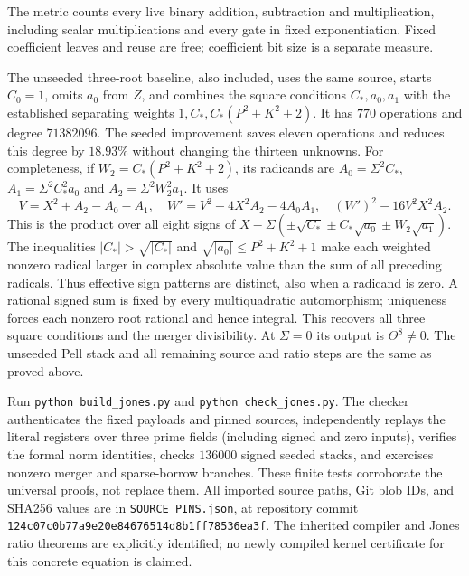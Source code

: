 The metric counts every live binary addition, subtraction and multiplication,
including scalar multiplications and every gate in fixed exponentiation.
Fixed coefficient leaves and reuse are free; coefficient bit size is a
separate measure.

The unseeded three-root baseline, also included, uses the same source,
starts $C_0=1$, omits $a_0$ from $Z$, and combines the square conditions
$C_*,a_0,a_1$ with the established separating weights
$1,C_*,C_*(P^2+K^2+2)$. It has $770$ operations and degree $71382096$.
The seeded improvement saves eleven operations and reduces this degree by
$18.93\%$ without changing the thirteen unknowns.
For completeness, if $W_2=C_*(P^2+K^2+2)$, its radicands are
$A_0=\Sigma^2C_*$, $A_1=\Sigma^2C_*^2a_0$ and
$A_2=\Sigma^2W_2^2a_1$. It uses
\[
 V=X^2+A_2-A_0-A_1,\quad
 W'=V^2+4X^2A_2-4A_0A_1,\quad
 (W')^2-16V^2X^2A_2.
\]
This is the product over all eight signs of
$X-\Sigma(\pm\sqrt{C_*}\pm C_*\sqrt{a_0}\pm W_2\sqrt{a_1})$.
The inequalities $|C_*|>\sqrt{|C_*|}$ and
$\sqrt{|a_0|}\le P^2+K^2+1$ make each weighted nonzero radical larger
in complex absolute value than the sum of all preceding radicals.
Thus effective sign patterns are distinct, also when a radicand is zero.
A rational signed sum is fixed by every multiquadratic automorphism;
uniqueness forces each nonzero root rational and hence integral.
This recovers all three square conditions and the merger divisibility.
At $\Sigma=0$ its output is $\Theta^8\ne0$. The unseeded Pell stack and
all remaining source and ratio steps are the same as proved above.

Run \texttt{python build\_jones.py} and
\texttt{python check\_jones.py}. The checker authenticates the fixed payloads
and pinned sources, independently replays the literal registers over three
prime fields (including signed and zero inputs), verifies the formal norm
identities, checks $136000$ signed seeded stacks, and exercises nonzero
merger and sparse-borrow branches. These finite tests corroborate the
universal proofs, not replace them.
All imported source paths, Git blob IDs, and SHA256 values are in
\texttt{SOURCE\_PINS.json}, at repository commit
\texttt{124c07c0b77a9e20e84676514d8b1ff78536ea3f}.
The inherited compiler and Jones ratio theorems are explicitly identified;
no newly compiled kernel certificate for this concrete equation is claimed.
